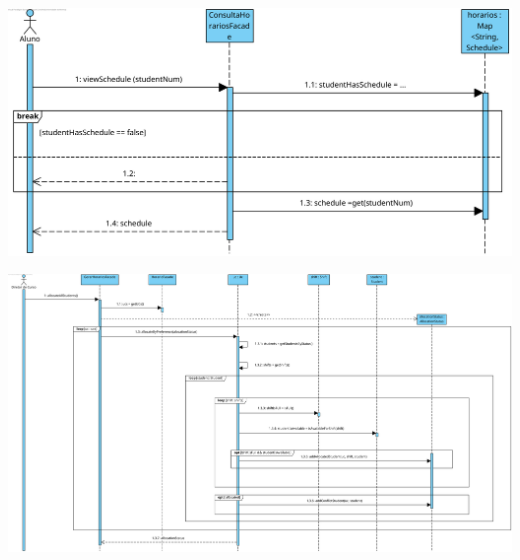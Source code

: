 \documentclass[a4paper,12pt]{scrreprt}
\begin{document}
\begin{minipage}{\textwidth}
    \centering
    \includegraphics[width=1\textwidth]{images/sequence-diagrams/1-consultar-horario.png}
    \label{fig:7-1-diagrama_de_sequencia_consultar_horario}
\end{minipage}

\vspace{1cm}

\begin{minipage}{\textwidth}
    \centering
    \includegraphics[width=1\textwidth]{images/sequence-diagrams/2-gerar-horarios.png}
    \label{fig:7-2-diagrama_de_sequencia_gerar_horarios}
\end{minipage}
\end{document}
